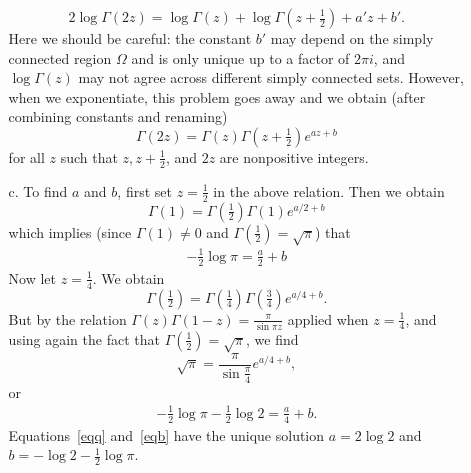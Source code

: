 \documentclass[11pt]{book}
\theoremstyle{definition}
\begin{document}
\begin{enumerate}
\begin{enumerate}
      \[ 2 \log \Gamma(2z) = \log \Gamma(z) + \log \Gamma(z+\tfrac 1 2) + a'z + b'.\]  Here we should be careful: the constant $b'$ may depend on the simply connected region $\Omega$ and is only unique up to a factor of $2\pi i$, and $\log \Gamma(z)$ may not agree across different simply connected sets.  However, when we exponentiate, this problem goes away and we obtain (after combining constants and renaming)
      \[ \Gamma(2z) = \Gamma(z) \Gamma(z+ \tfrac 1 2) e^{az + b}\]  for all $z$ such that $z,z+\tfrac 1 2$, and $2z$ are nonpositive integers. 

    \item[c.]  To find $a$ and $b$, first set $z=\tfrac{1}{2}$ in the above relation.  Then we obtain 
      \[ \Gamma(1) = \Gamma(\tfrac 1 2) \Gamma(1) e^{a/2 + b} \] which implies (since $\Gamma(1) \neq 0$ and $\Gamma(\tfrac 1 2)  = \sqrt \pi$) that 
      \begin{align}
        -\tfrac 1 2 \log \pi = \tfrac a 2  + b \label{eqq}
      \end{align}
      Now let $z  = \tfrac 1 4$.  We obtain
      \[ \Gamma(\tfrac 1 2) = \Gamma(\tfrac 1 4) \Gamma( \tfrac 3 4) e^{a/4 + b}.\]   But by the relation $\Gamma(z)\Gamma(1-z) = \frac{\pi}{\sin \pi z}$ applied when $z=\tfrac 1 4$, and using again the fact that $\Gamma(\tfrac 1 2) = \sqrt \pi$, we find 
      \[ \sqrt \pi = \frac{\pi}{\sin \tfrac{\pi}{4}} e^{a/4+b}, \]  or
      \begin{align}
           -\tfrac 1 2 \log \pi - \tfrac 1 2 \log 2 = \tfrac a 4 + b .    \label{eqb}
         \end{align}  Equations~\eqref{eqq} and~\eqref{eqb} have the unique solution $a= 2 \log 2$ and $b= - \log 2 - \tfrac 1 2 \log \pi$.
    \end{enumerate}



\end{enumerate}
\end{document}
